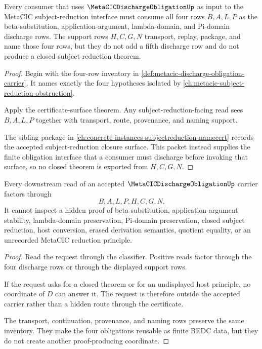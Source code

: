 \begin{theorem}
\label{thm:metacic-discharge-obligation-parameterized-interface}
Every consumer that uses $\MetaCICDischargeObligationUp$ as input to the MetaCIC subject-reduction interface must consume all four rows $B,A,L,P$ as the beta-substitution, application-argument, lambda-domain, and Pi-domain discharge rows. The support rows $H,C,G,N$ transport, replay, package, and name those four rows, but they do not add a fifth discharge row and do not produce a closed subject-reduction theorem.
\end{theorem}
\begin{proof}
Begin with the four-row inventory in \autoref{def:metacic-discharge-obligation-carrier}. It names exactly the four hypotheses isolated by \autoref{ch:metacic-subject-reduction-obstruction}.

Apply the certificate-surface theorem. Any subject-reduction-facing read sees $B,A,L,P$ together with transport, route, provenance, and naming support.

The sibling package in \autoref{ch:concrete-instances-subjectreduction-namecert} records the accepted subject-reduction closure surface. This packet instead supplies the finite obligation interface that a consumer must discharge before invoking that surface, so no closed theorem is exported from $H,C,G,N$.
\end{proof}

\begin{theorem}
\label{thm:metacic-discharge-obligation-non-escape}
Every downstream read of an accepted $\MetaCICDischargeObligationUp$ carrier factors through
$$
B,A,L,P,H,C,G,N.
$$
It cannot inspect a hidden proof of beta substitution, application-argument stability, lambda-domain preservation, Pi-domain preservation, closed subject reduction, host conversion, erased derivation semantics, quotient equality, or an unrecorded MetaCIC reduction principle.
\end{theorem}
\begin{proof}
Read the request through the classifier. Positive reads factor through the four discharge rows or through the displayed support rows.

If the request asks for a closed theorem or for an undisplayed host principle, no coordinate of $D$ can answer it. The request is therefore outside the accepted carrier rather than a hidden route through the certificate.

The transport, continuation, provenance, and naming rows preserve the same inventory. They make the four obligations reusable as finite BEDC data, but they do not create another proof-producing coordinate.
\end{proof}

